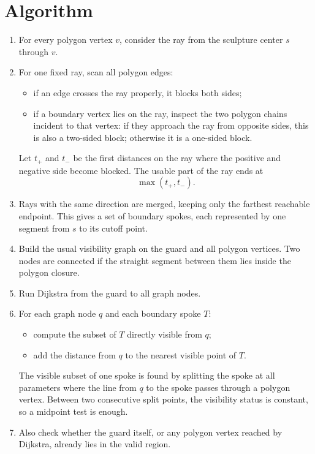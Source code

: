 \documentclass[11pt]{article}
\begin{document}
\section*{Algorithm}

\begin{enumerate}[leftmargin=*]
    \item For every polygon vertex $v$, consider the ray from the sculpture center $s$ through $v$.

    \item For one fixed ray, scan all polygon edges:
    \begin{itemize}[leftmargin=*]
        \item if an edge crosses the ray properly, it blocks both sides;
        \item if a boundary vertex lies on the ray, inspect the two polygon chains incident to that vertex:
        if they approach the ray from opposite sides, this is also a two-sided block; otherwise it is a
        one-sided block.
    \end{itemize}
    Let $t_+$ and $t_-$ be the first distances on the ray where the positive and negative side become
    blocked. The usable part of the ray ends at
    \[
        \max(t_+, t_-).
    \]

    \item Rays with the same direction are merged, keeping only the farthest reachable endpoint. This gives
    a set of boundary spokes, each represented by one segment from $s$ to its cutoff point.

    \item Build the usual visibility graph on the guard and all polygon vertices. Two nodes are connected if
    the straight segment between them lies inside the polygon closure.

    \item Run Dijkstra from the guard to all graph nodes.

    \item For each graph node $q$ and each boundary spoke $T$:
    \begin{itemize}[leftmargin=*]
        \item compute the subset of $T$ directly visible from $q$;
        \item add the distance from $q$ to the nearest visible point of $T$.
    \end{itemize}
    The visible subset of one spoke is found by splitting the spoke at all parameters where the line from
    $q$ to the spoke passes through a polygon vertex. Between two consecutive split points, the visibility
    status is constant, so a midpoint test is enough.

    \item Also check whether the guard itself, or any polygon vertex reached by Dijkstra, already lies in
    the valid region.
\end{enumerate}
\end{document}
